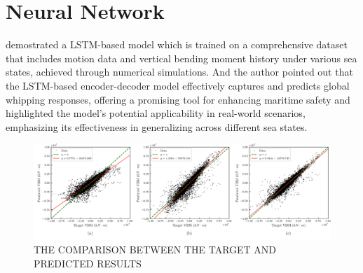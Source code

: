\documentclass[12pt]{article} %
\begin{document}
\clearpage
\section{Neural Network}
\cite{7} demostrated a LSTM-based model which is trained on a comprehensive dataset that includes motion data and vertical bending moment history under various sea states, achieved through numerical simulations. And the author pointed out that 
the LSTM-based encoder-decoder model effectively captures and predicts global whipping responses, offering a promising tool for enhancing maritime safety and highlighted the model's potential applicability in real-world scenarios, emphasizing its effectiveness in generalizing across different sea states.
\begin{figure}[ht]
    \centering
    \includegraphics[width=1\textwidth]{RNN.png}
    \caption{THE COMPARISON BETWEEN THE TARGET AND PREDICTED RESULTS\cite{7}}
\end{figure}

\clearpage
\end{document}
